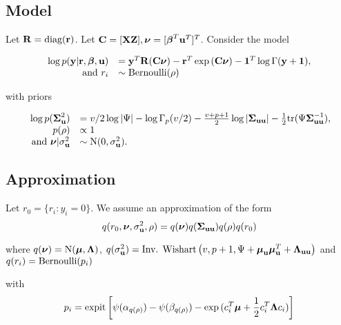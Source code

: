 \documentclass{article}[12pt]
\begin{document}


\subsection{Model}
Let ${\bf R} = \text{diag}{({\bf r})}$. Let ${\bf C} = [{\bf X} {\bf Z}], {\boldsymbol \nu} = [{\boldsymbol \beta}^T {\bf u}^T]^T$. Consider the
model

$$
\begin{array}{rl}
\log{p({\bf y}|{\bf r}, {\boldsymbol\beta}, {\bf u})} &= {\bf y}^T {\bf R} ({\bf C}{\boldsymbol \nu}) - {\bf r}^T \exp{({\bf C}{\boldsymbol\nu})} - {\bf 1}^T \log{\Gamma{({\bf y}+ {\bf1})}}, \\
\mbox{ and }
r_i &\sim \text{Bernoulli}(\rho) \\
\end{array}
$$

\noindent with priors

$$ 
\begin{array}{rl}
\log{p({\boldsymbol\Sigma}_{\bf u}^2)} &= v/2 \log |\Psi| - \log \Gamma_p (v/2) - \frac{v+p+1}{2} \log | {\boldsymbol \Sigma}_{{\bf u} {\bf u}}| - {\frac{1}{2}} \text{tr} (\Psi {\boldsymbol\Sigma}^{-1}_{{\bf u} {\bf u}}),\\
p(\rho) &\propto 1 \\
\mbox{ and } {\boldsymbol\nu}|\sigma_{\bf u}^2 &\sim \mbox{N}(0, \sigma_{\bf u}^2). \\
\end{array}
$$

\subsection{Approximation}
Let $r_0 = \{ r_i : y_i = 0 \}$.
We assume an approximation of the form
$$
q(r_0, {\boldsymbol \nu}, \sigma_{{\bf u}}^2, \rho) = q({\boldsymbol \nu}) q({\boldsymbol \Sigma}_{{\bf u} {\bf u}}) q(\rho) q(r_0) \\
$$

\noindent where $q({\boldsymbol \nu}) = \mbox{N}({\boldsymbol \mu}, {\boldsymbol \Lambda})$, $q(\sigma_{{\bf u}}^2) = \mbox{Inv. Wishart}\left(v, p+1, \Psi + {\boldsymbol \mu}_{\bf u} {\boldsymbol \mu}_{\bf u}^T + {\boldsymbol \Lambda}_{{\bf u} {\bf u}}\right)$ \mbox{and } $q(r_i) = \text{Bernoulli} (p_i)$

\noindent with
$$
p_i = \text{expit} \left[ \psi{(\alpha_{q(\rho)})} - \psi{(\beta_{q(\rho)})} - \exp{(c_i^T{\boldsymbol\mu}+ {\frac{1}{2}}c_i^T {\boldsymbol\Lambda}c_i)} \right]
$$
\end{document}
